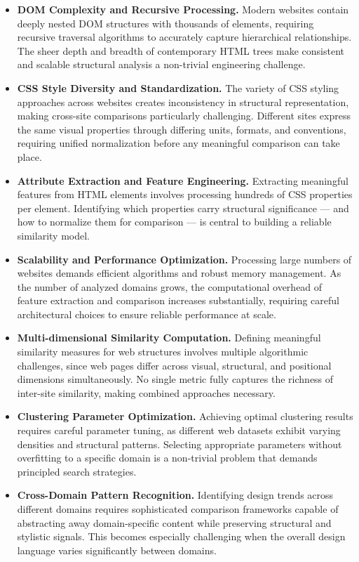 \begin{itemize}
    \item \textbf{DOM Complexity and Recursive Processing.} Modern websites contain deeply nested DOM structures with thousands of elements, requiring recursive traversal algorithms to accurately capture hierarchical relationships. The sheer depth and breadth of contemporary HTML trees make consistent and scalable structural analysis a non-trivial engineering challenge.

    \item \textbf{CSS Style Diversity and Standardization.} The variety of CSS styling approaches across websites creates inconsistency in structural representation, making cross-site comparisons particularly challenging. Different sites express the same visual properties through differing units, formats, and conventions, requiring unified normalization before any meaningful comparison can take place.

    \item \textbf{Attribute Extraction and Feature Engineering.} Extracting meaningful features from HTML elements involves processing hundreds of CSS properties per element. Identifying which properties carry structural significance — and how to normalize them for comparison — is central to building a reliable similarity model.

    \item \textbf{Scalability and Performance Optimization.} Processing large numbers of websites demands efficient algorithms and robust memory management. As the number of analyzed domains grows, the computational overhead of feature extraction and comparison increases substantially, requiring careful architectural choices to ensure reliable performance at scale.

    \item \textbf{Multi-dimensional Similarity Computation.} Defining meaningful similarity measures for web structures involves multiple algorithmic challenges, since web pages differ across visual, structural, and positional dimensions simultaneously. No single metric fully captures the richness of inter-site similarity, making combined approaches necessary.

    \item \textbf{Clustering Parameter Optimization.} Achieving optimal clustering results requires careful parameter tuning, as different web datasets exhibit varying densities and structural patterns. Selecting appropriate parameters without overfitting to a specific domain is a non-trivial problem that demands principled search strategies.

    \item \textbf{Cross-Domain Pattern Recognition.} Identifying design trends across different domains requires sophisticated comparison frameworks capable of abstracting away domain-specific content while preserving structural and stylistic signals. This becomes especially challenging when the overall design language varies significantly between domains.
\end{itemize}

